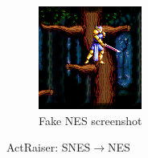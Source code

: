 \documentclass[10pt,twocolumn,letterpaper]{article}
\begin{document}
\begin{figure}[H]
\begin{subfigure}[b]{0.225\textwidth}
      \includegraphics[width=\textwidth, height=0.9\textwidth]{figures/snes_to_nes/AV_Mahjong_Club_(J)_(Unl)_copy__ucc__8_fake_A.png}
      \caption{Fake NES screenshot}
      \label{fig:ss1b}
   \end{subfigure}
   \caption{ActRaiser: SNES$\rightarrow$NES}
\end{figure}
\end{document}
